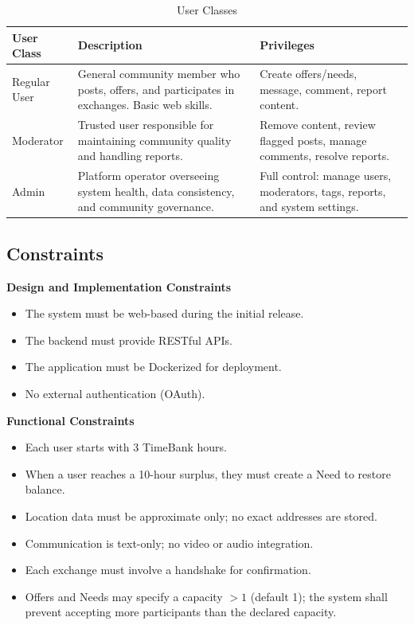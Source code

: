 \documentclass[11pt,a4paper]{report}
\begin{document}
\begin{table}[h]
    \centering
    \begin{tabularx}{\textwidth}{|l|X|X|}
        \hline
        \textbf{User Class} & \textbf{Description}                                                                         & \textbf{Privileges}                                                         \\
        \hline
        Regular User        & General community member who posts, offers, and participates in exchanges. Basic web skills. & Create offers/needs, message, comment, report content.                      \\
        \hline
        Moderator           & Trusted user responsible for maintaining community quality and handling reports.             & Remove content, review flagged posts, manage comments, resolve reports.     \\
        \hline
        Admin               & Platform operator overseeing system health, data consistency, and community governance.      & Full control: manage users, moderators, tags, reports, and system settings. \\
        \hline
    \end{tabularx}
    \caption{User Classes}
\end{table}

\subsection{Constraints}

\textbf{Design and Implementation Constraints}
\begin{itemize}
    \item The system must be web-based during the initial release.
    \item The backend must provide RESTful APIs.
    \item The application must be Dockerized for deployment.
    \item No external authentication (OAuth).
\end{itemize}

\textbf{Functional Constraints}
\begin{itemize}
    \item Each user starts with 3 TimeBank hours.
    \item When a user reaches a 10-hour surplus, they must create a Need to restore balance.
    \item Location data must be approximate only; no exact addresses are stored.
    \item Communication is text-only; no video or audio integration.
    \item Each exchange must involve a handshake for confirmation.
    \item Offers and Needs may specify a capacity $> 1$ (default 1); the system shall prevent accepting more participants than the declared capacity.
\end{itemize}
\end{document}
